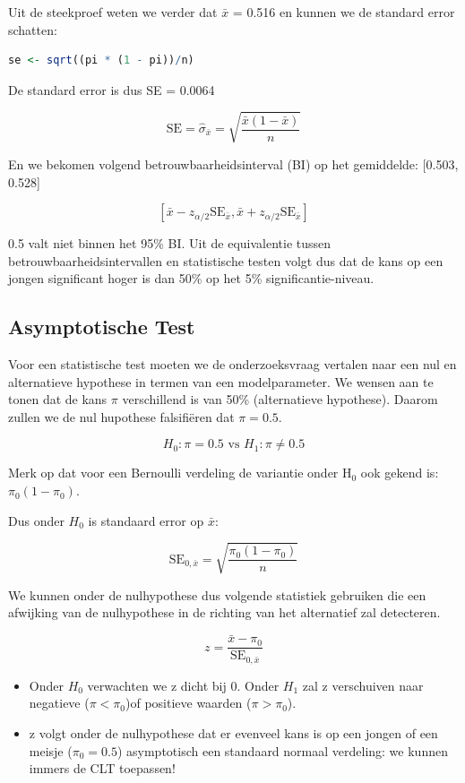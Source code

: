 \documentclass[
  12pt,dutch,coursenotes]{book}
\theoremstyle{definition}
\theoremstyle{definition}
\theoremstyle{definition}
\theoremstyle{definition}
\theoremstyle{remark}
\begin{document}
Uit de steekproef weten we verder dat \(\bar x\) = 0.516 en kunnen we de standard error schatten:

\begin{lstlisting}[language=R]
se <- sqrt((pi * (1 - pi))/n)
\end{lstlisting}

De standard error is dus SE = 0.0064

\[
\text{SE} = \hat\sigma_{\bar x} = \sqrt{\frac{\bar x(1-\bar x)}{n}} \]

En we bekomen volgend betrouwbaarheidsinterval (BI) op het gemiddelde: {[}0.503, 0.528{]}

\[ [\bar x - z_{\alpha/2} \text{SE}_{\bar x}, \bar x + z_{\alpha/2} \text{SE}_{\bar x}]\]

0.5 valt niet binnen het 95\% BI. Uit de equivalentie tussen betrouwbaarheidsintervallen en statistische testen volgt dus dat de kans op een jongen significant hoger is dan 50\% op het 5\% significantie-niveau.

\hypertarget{asymptotische-test}{%
\subsection{Asymptotische Test}\label{asymptotische-test}}

Voor een statistische test moeten we de onderzoeksvraag vertalen naar een nul en alternatieve hypothese in termen van een modelparameter.
We wensen aan te tonen dat de kans \(\pi\) verschillend is van 50\% (alternatieve hypothese).
Daarom zullen we de nul hupothese falsifiëren dat \(\pi = 0.5\).

\[H_0: \pi = 0.5 \text{ vs } H_1: \pi \neq 0.5\]

Merk op dat voor een Bernoulli verdeling de variantie onder H\(_0\) ook gekend is: \(\pi_0 (1-\pi_0)\).

Dus onder \(H_0\) is standaard error op \(\bar x\):

\[
\text{SE}_{0, \bar x}=\sqrt{\frac{\pi_0 (1-\pi_0)}{n}}
\]

We kunnen onder de nulhypothese dus volgende statistiek gebruiken die een afwijking van de nulhypothese in de richting van het alternatief zal detecteren.

\[ z = \frac{\bar x - \pi_0}{\text{SE}_{0, \bar x}}\]

\begin{itemize}
\item
  Onder \(H_0\) verwachten we z dicht bij 0. Onder \(H_1\) zal z verschuiven naar negatieve (\(\pi < \pi_0\))of positieve waarden (\(\pi>\pi_0\)).
\item
  z volgt onder de nulhypothese dat er evenveel kans is op een jongen of een meisje (\(\pi_0=0.5\)) asymptotisch een standaard normaal verdeling: we kunnen immers de CLT toepassen!
\end{itemize}
\end{document}
